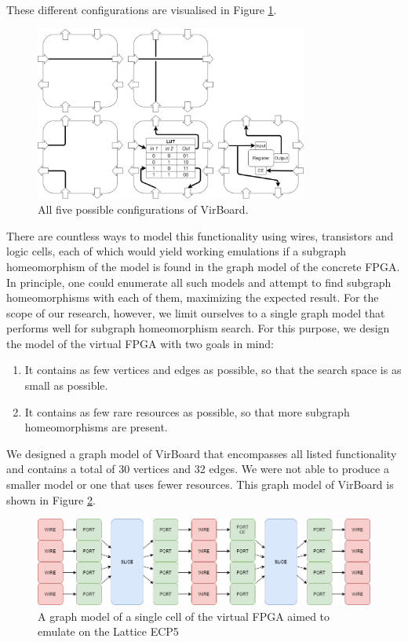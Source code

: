 These different configurations are visualised in Figure \ref{fig:virboardconfigs}.

\begin{figure}
\centering
\includegraphics[width=0.8\textwidth]{images/virboard.png}
\caption{All five possible configurations of VirBoard.}
\label{fig:virboardconfigs}
\end{figure}	

There are countless ways to model this functionality using wires, transistors and logic cells, each of which would yield working emulations if a subgraph homeomorphism of the model is found in the graph model of the concrete FPGA. In principle, one could enumerate all such models and attempt to find subgraph homeomorphisms with each of them, maximizing the expected result. For the scope of our research, however, we limit ourselves to a single graph model that performs well for subgraph homeomorphism search. For this purpose, we design the model of the virtual FPGA with two goals in mind:

\begin{enumerate}
\item It contains as few vertices and edges as possible, so that the search space is as small as possible.
\item It contains as few rare resources as possible, so that more subgraph homeomorphisms are present.
\end{enumerate}

We designed a graph model of VirBoard that encompasses all listed functionality and contains a total of 30 vertices and 32 edges. We were not able to produce a smaller model or one that uses fewer resources. This graph model of VirBoard is shown in Figure \ref{fig:virboard}.



\begin{figure}
\centering
\includegraphics[width=\textwidth]{images/virtualFPGA2.png}
\caption{A graph model of a single cell of the virtual FPGA aimed to emulate on the Lattice ECP5}
\label{fig:virboard}
\end{figure}	

